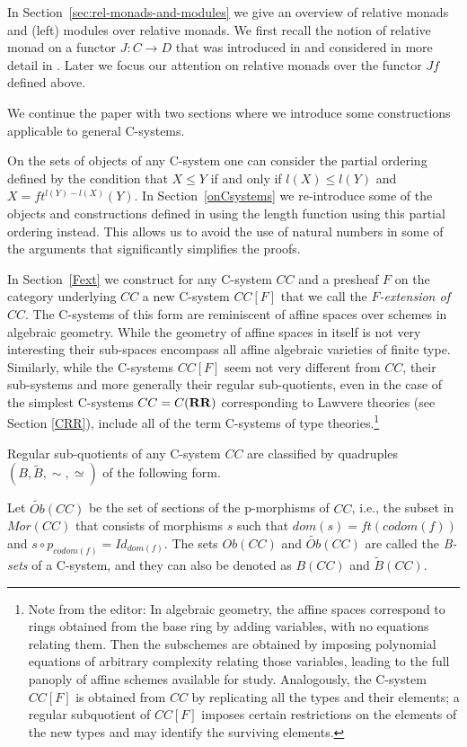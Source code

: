 \documentclass[onecolumn,12pt]{amsart}
\numberwithin{proposition}{subsection}
\newcommand{\sr}{\rightarrow}
\newcommand{\wt}{\widetilde}
\newcommand{\RR}{{\bf RR}}
\newcommand{\editorfootnote}[1]{\footnote{Note from the editor: #1}}
\begin{document}
In Section~\ref{sec:rel-monads-and-modules} we give an overview of relative monads and (left) modules over relative monads.
We first recall the notion of relative monad on a
functor $J:C\sr D$ that was introduced in \cite[Def.1, p.~299]{ACU} and
considered in more detail in \cite{ACU2}.
Later we focus our attention on
relative monads over the functor $Jf$ defined above.


We continue the paper with two sections where we introduce some constructions
applicable to general C-systems.

On the sets of objects of any C-system one can consider the partial ordering
defined by the condition that $X\le Y$ if and only if $l(X)\le l(Y)$ and
$X=ft^{l(Y)-l(X)}(Y)$. In Section~\ref{onCsystems} we re-introduce some of the objects
and constructions defined in \cite{Csubsystems} using the length function using
this partial ordering instead. This allows us to avoid the use of natural numbers
in some of the arguments that significantly simplifies the proofs.

In Section~\ref{Fext} we construct for any C-system $CC$ and a presheaf $F$ on
the category underlying $CC$ a new C-system $CC[F]$ that we call the
{\em $F$-extension of $CC$}. The C-systems of this form are reminiscent of affine
spaces over schemes in algebraic geometry. While the geometry of affine spaces
in itself is not very interesting their sub-spaces encompass all affine
algebraic varieties of finite type. Similarly, while the C-systems $CC[F]$
seem not very different from $CC$, their sub-systems and more generally their
regular sub-quotients, even in the case of the simplest C-systems $CC=C(\RR)$
corresponding to Lawvere theories (see Section \ref{CRR}), include all of the
term C-systems of type theories.\editorfootnote{In algebraic geometry, the affine
  spaces correspond to rings obtained from the base ring by adding variables, with
  no equations relating them.  Then the subschemes are obtained by imposing
  polynomial equations of arbitrary complexity relating those variables, leading
  to the full panoply of affine schemes available for study.  Analogously, the
  C-system $CC[F]$ is obtained from $CC$ by replicating all the types and their
  elements; a regular subquotient of $CC[F]$ imposes certain restrictions on
  the elements of the new types and may identify the surviving elements.}

Regular sub-quotients of any C-system $CC$ are classified by quadruples
$(B,\wt{B}, \sim,\simeq)$ of the following form.

Let $\wt{Ob}(CC)$ be the set of sections of the p-morphisms of $CC$, i.e., the
subset in $Mor(CC)$ that consists of morphisms $s$ such that
$dom(s)=ft(codom(f))$ and $s\circ p_{codom(f)}=Id_{dom(f)}$.  The sets $Ob(CC)$
and $\wt{Ob}(CC)$ are called the {\em B-sets} of a C-system, and they can also be denoted
as $B(CC)$ and $\wt{B}(CC)$.
\end{document}
